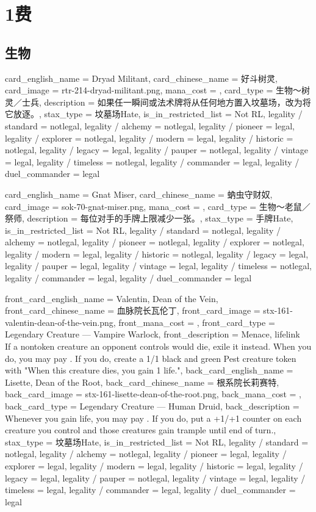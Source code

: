 \documentclass[lang = cn, color = black, 10pt]{AllThatStax}
\begin{document}
\chapter{1费}

\section{生物}

\card
{
	card_english_name = {Dryad Militant},
	card_chinese_name = {好斗树灵},
	card_image = rtr-214-dryad-militant.png,
	mana_cost = ,
	card_type = 生物～树灵／士兵,
	description = {如果任一瞬间或法术牌将从任何地方置入坟墓场，改为将它放逐。},
	stax_type = 坟墓场Hate,
	is_in_restricted_list = Not RL,
	legality / standard = notlegal,
	legality / alchemy = notlegal,
	legality / pioneer = legal,
	legality / explorer = notlegal,
	legality / modern = legal,
	legality / historic = notlegal,
	legality / legacy = legal,
	legality / pauper = notlegal,
	legality / vintage = legal,
	legality / timeless = notlegal,
	legality / commander = legal,
	legality / duel_commander = legal
}

\card
{
	card_english_name = {Gnat Miser},
	card_chinese_name = {蚋虫守财奴},
	card_image = sok-70-gnat-miser.png,
	mana_cost = ,
	card_type = 生物～老鼠／祭师,
	description = {每位对手的手牌上限减少一张。},
	stax_type = 手牌Hate,
	is_in_restricted_list = Not RL,
	legality / standard = notlegal,
	legality / alchemy = notlegal,
	legality / pioneer = notlegal,
	legality / explorer = notlegal,
	legality / modern = legal,
	legality / historic = notlegal,
	legality / legacy = legal,
	legality / pauper = legal,
	legality / vintage = legal,
	legality / timeless = notlegal,
	legality / commander = legal,
	legality / duel_commander = legal
}

\mfcard
{
	front_card_english_name = {Valentin, Dean of the Vein},
	front_card_chinese_name = {血脉院长瓦伦丁},
	front_card_image = stx-161-valentin-dean-of-the-vein.png,
	front_mana_cost = ,
	front_card_type = Legendary Creature — Vampire Warlock,
	front_description = {Menace, lifelink\\
		If a nontoken creature an opponent controls would die, exile it instead. When you do, you may pay . If you do, create a 1/1 black and green Pest creature token with "When this creature dies, you gain 1 life."},
	back_card_english_name = {Lisette, Dean of the Root},
	back_card_chinese_name = {根系院长莉赛特},
	back_card_image = stx-161-lisette-dean-of-the-root.png,
	back_mana_cost = ,
	back_card_type = Legendary Creature — Human Druid,
	back_description = {Whenever you gain life, you may pay . If you do, put a +1/+1 counter on each creature you control and those creatures gain trample until end of turn.},
	stax_type = 坟墓场Hate,
	is_in_restricted_list = Not RL,
	legality / standard = notlegal,
	legality / alchemy = notlegal,
	legality / pioneer = legal,
	legality / explorer = legal,
	legality / modern = legal,
	legality / historic = legal,
	legality / legacy = legal,
	legality / pauper = notlegal,
	legality / vintage = legal,
	legality / timeless = legal,
	legality / commander = legal,
	legality / duel_commander = legal
}
\end{document}
